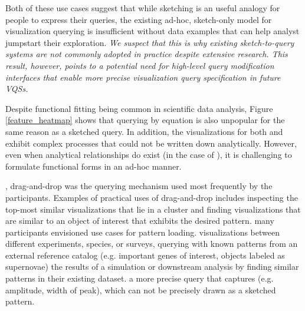 {\par Both of these use cases suggest that while sketching is an useful analogy for people to express their queries, the existing ad-hoc, sketch-only model for visualization querying is insufficient without data examples that can help analyst jumpstart their exploration. \emph{We suspect that this is why existing sketch-to-query systems are not commonly adopted in practice despite extensive research. This result, however, points to a potential need for high-level query modification interfaces that enable more precise visualization query specification in future VQSs.}} %
\par Despite functional fitting being common in scientific data analysis, Figure \ref{feature_heatmap} shows that querying by equation is also unpopular for the same reason as a sketched query. In addition, the visualizations for both \astro and \bio exhibit complex processes that could not be written down  analytically. However, even when analytical relationships do exist (in the case of \matsci), it is challenging to formulate functional forms in an  ad-hoc manner. %
\par {}, drag-and-drop was the querying mechanism used most frequently by the participants. Examples of practical uses of drag-and-drop includes inspecting the top-most similar visualizations that lie in a cluster and finding visualizations that are similar to an object of interest that exhibits the desired pattern.  many participants envisioned use cases for pattern loading.  visualizations between different experiments, species, or surveys, querying with known patterns from an external reference catalog (e.g. important genes of interest, objects labeled as supernovae)  the results of a simulation or downstream analysis by finding similar patterns in their existing dataset.  a more precise query that captures  (e.g. amplitude, width of peak), which can not be precisely drawn as a sketched pattern. 
